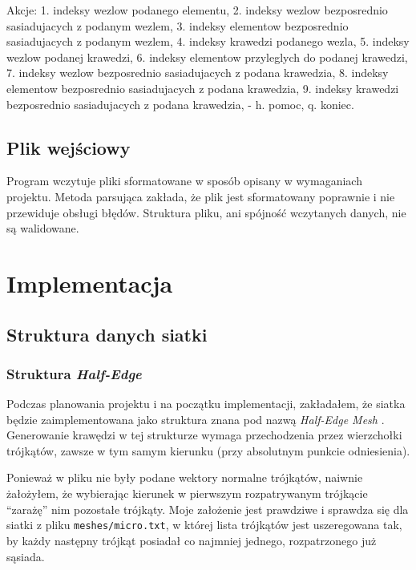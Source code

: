 \documentclass[10pt,a4paper]{article}
\newcommand{\f}[1]{\texttt{#1}}
\begin{document}
\begin{SmallVerbatim}
    Akcje: 
     1. indeksy wezlow podanego elementu,
     2. indeksy wezlow bezposrednio sasiadujacych z podanym wezlem,
     3. indeksy elementow bezposrednio sasiadujacych z podanym wezlem,
     4. indeksy krawedzi podanego wezla,
     5. indeksy wezlow podanej krawedzi,
     6. indeksy elementow przyleglych do podanej krawedzi,
     7. indeksy wezlow bezposrednio sasiadujacych z podana krawedzia,
     8. indeksy elementow bezposrednio sasiadujacych z podana krawedzia,
     9. indeksy krawedzi bezposrednio sasiadujacych z podana krawedzia,
     -
     h. pomoc,
     q. koniec. 
\end{SmallVerbatim}


\subsection{Plik wejściowy}

Program wczytuje pliki sformatowane w sposób opisany w wymaganiach projektu.
Metoda parsująca zakłada, że plik jest sformatowany poprawnie i nie przewiduje
obsługi błędów. Struktura pliku, ani spójność wczytanych danych, nie są
walidowane.



\section{Implementacja}


\subsection{Struktura danych siatki}
\label{sub:struktura_danych_siatki}

\subsubsection{Struktura \emph{Half-Edge}}

Podczas planowania projektu i na początku implementacji, zakładałem, że siatka
będzie zaimplementowana jako struktura znana pod nazwą \emph{Half-Edge Mesh}
\cite{half_edge}. Generowanie krawędzi w tej strukturze wymaga przechodzenia
przez wierzchołki trójkątów, zawsze w tym samym kierunku (przy absolutnym
punkcie odniesienia).

Ponieważ w pliku nie były podane wektory normalne trójkątów, naiwnie
żałożyłem, że wybierając kierunek w pierwszym rozpatrywanym trójkącie
``zarażę'' nim pozostałe trójkąty. Moje założenie jest prawdziwe i sprawdza
się dla siatki z pliku \f{meshes/micro.txt}, w której lista trójkątów jest
uszeregowana tak, by każdy następny trójkąt posiadał co najmniej jednego,
rozpatrzonego już sąsiada.
\end{document}
